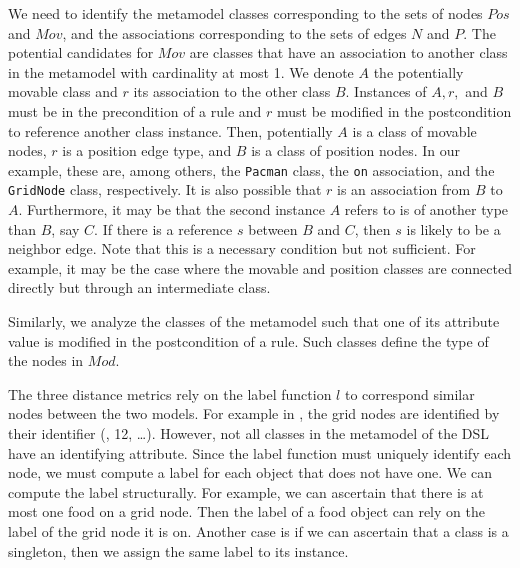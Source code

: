 We need to identify the metamodel classes corresponding to the sets of nodes $Pos$ and $Mov$, and the associations corresponding to the sets of edges $N$ and $P$.
The potential candidates for $Mov$ are classes that have an association to another class in the metamodel with cardinality at most 1.
We denote $A$ the potentially movable class and $r$ its association to the other class $B$.
Instances of $A,r,$ and $B$ must be in the precondition of a rule and $r$ must be modified in the postcondition to reference another class instance.
Then, potentially $A$ is a class of movable nodes, $r$ is a position edge type, and $B$ is a class of position nodes.
In our example, these are, among others, the \texttt{Pacman} class, the \texttt{on} association, and the \texttt{GridNode} class, respectively.
It is also possible that $r$ is an association from $B$ to $A$.
Furthermore, it may be that the second instance $A$ refers to is of another type than $B$, say $C$.
If there is a reference $s$ between $B$ and $C$, then $s$ is likely to be a neighbor edge.
Note that this is a necessary condition but not sufficient.
For example, it may be the case where the movable and position classes are connected directly but through an intermediate class.

Similarly, we analyze the classes of the metamodel such that one of its attribute value is modified in the postcondition of a rule.
Such classes define the type of the nodes in $Mod$.

The three distance metrics rely on the label function $l$ to correspond similar nodes between the two models.
For example in , the grid nodes are identified by their identifier (, 12, \ldots).
However, not all classes in the metamodel of the DSL have an identifying attribute.
Since the label function must uniquely identify each node, we must compute a label for each object that does not have one.
We can compute the label structurally.
For example, we can ascertain that there is at most one food on a grid node.
Then the label of a food object can rely on the label of the grid node it is on.
Another case is if we can ascertain that a class is a singleton, then we assign the same label to its instance.
